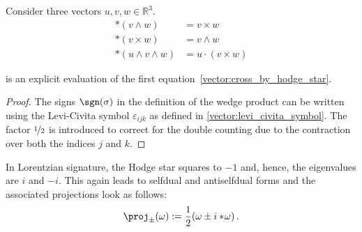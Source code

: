     \begin{result}\label{vector:hodge_star_vectorcalculus}
        Consider three vectors $u,v,w\in\mathbb{R}^3$.
        \begin{align}
            \ast(v\wedge w) &= v\times w \label{vector:cross_by_hodge_star}\\
            \ast(v\times w) &= v\wedge w\\
            \ast(u\wedge v\wedge w) &= u\cdot(v\times w)
        \end{align}
    \end{result}
    \begin{remark}
         is an explicit evaluation of the first equation~\eqref{vector:cross_by_hodge_star}.
        \begin{mdframed}[roundcorner=10pt, linecolor=blue, linewidth=1pt]
            \begin{proof}
                The signs $\sgn(\sigma)$ in the definition of the wedge product can be written using the Levi-Civita symbol $\varepsilon_{ijk}$ as defined in \cref{vector:levi_civita_symbol}. The factor $\nicefrac{1}{2}$ is introduced to correct for the double counting due to the contraction over both the indices $j$ and $k$.
            \end{proof}
        \end{mdframed}
    \end{remark}

    \begin{remark}\label{vector:lorentzian_selfduality}
        In Lorentzian signature, the Hodge star squares to $-1$ and, hence, the eigenvalues are $i$ and $-i$. This again leads to selfdual and antiselfdual forms and the associated projections look as follows:
        \begin{gather}
            \proj_\pm(\omega) := \frac{1}{2}(\omega\pm i\ast\!\omega)\,.
        \end{gather}
    \end{remark}

